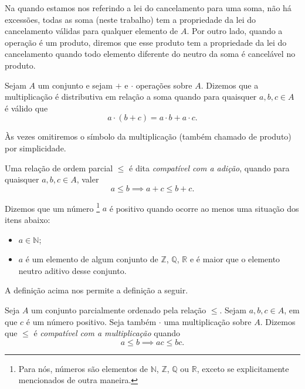 \documentclass[../main.tex]{subfiles}
\begin{document}
\begin{obs}
    Na  quando estamos nos referindo a lei do cancelamento para uma soma, não há excessões, todas as soma (neste trabalho) tem a propriedade da lei do cancelamento válidas para qualquer elemento de $A$. Por outro lado, quando a operação é um produto, diremos que esse produto tem a propriedade da lei do cancelamento quando todo elemento diferente do neutro da soma é cancelável no produto.
\end{obs}

\begin{defi}
    Sejam $A$ um conjunto e sejam $+$ e $\cdot$ operações sobre $A$. Dizemos que a multiplicação é distributiva em relação a soma quando para quaisquer $a, b, c \in A$ é válido que \[ a \cdot (b + c) = a \cdot b + a\cdot c. \]
\end{defi}
Às vezes omitiremos o símbolo da multiplicação (também chamado de produto) por simplicidade.
\begin{defi}
    Uma relação de ordem parcial $\leq$ é dita \emph{compatível com a adição}, quando para quaisquer $a,b,c \in A$, 
    valer \[ a \leq b \implies a + c \leq b + c. \]
\end{defi}

\begin{defi}\label{agb-def-numPositivo}
    Dizemos que um número \footnote{Para nós, números são elementos de $\mathbb{N}$, $\mathbb{Z}$, $\mathbb{Q}$ ou $\mathbb{R}$, exceto se explicitamente mencionados de outra maneira.} $a$ é positivo quando ocorre ao menos uma situação dos itens abaixo:
    \begin{itemize}
        \item $a \in \mathbb{N}$;
        \item $a$ é um elemento de algum conjunto de $\mathbb{Z}$, $\mathbb{Q}$, $\mathbb{R}$ e é maior que o elemento neutro aditivo desse conjunto.
    \end{itemize}
\end{defi}

A definição acima nos permite a definição a seguir.
\begin{defi}
    Seja $A$ um conjunto parcialmente ordenado pela relação $\leq$. Sejam $a,b,c \in A$, em que $c$ é um número positivo. Seja também $\cdot$ uma multiplicação sobre $A$.
    Dizemos que $\leq$ é \emph{compatível com a multiplicação} quando 
    \[ a \leq b \implies ac \leq bc. \]
\end{defi}
\end{document}
